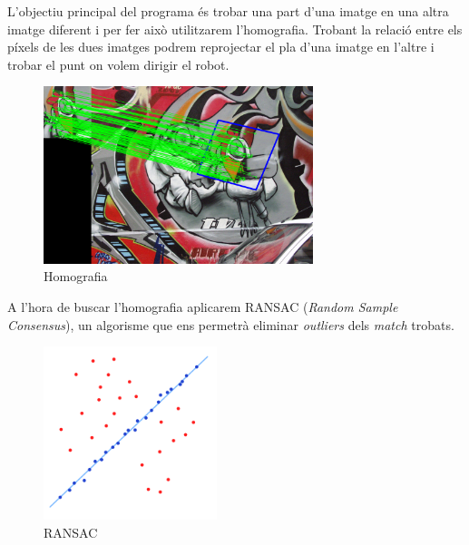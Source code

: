 	L'objectiu principal del programa és trobar una part d'una imatge en una altra imatge diferent i per fer això utilitzarem l'homografia. Trobant la relació entre els píxels de les dues imatges podrem
	reprojectar el pla d'una imatge en l'altre i trobar el punt on volem dirigir el robot.\\
	\begin{figure}[H]
		\centering
		\includegraphics[width=0.7\textwidth]{images/homography}
		\caption{Homografia}
	\end{figure}
	\noindent
	A l'hora de buscar l'homografia aplicarem RANSAC (\textit{Random Sample Consensus}), un algorisme que ens permetrà eliminar \textit{outliers} dels \textit{match} trobats.\\
	\begin{figure}[H]
		\centering
		\includegraphics[width=0.45\textwidth]{images/ransac}
		\caption{RANSAC}
	\end{figure}
